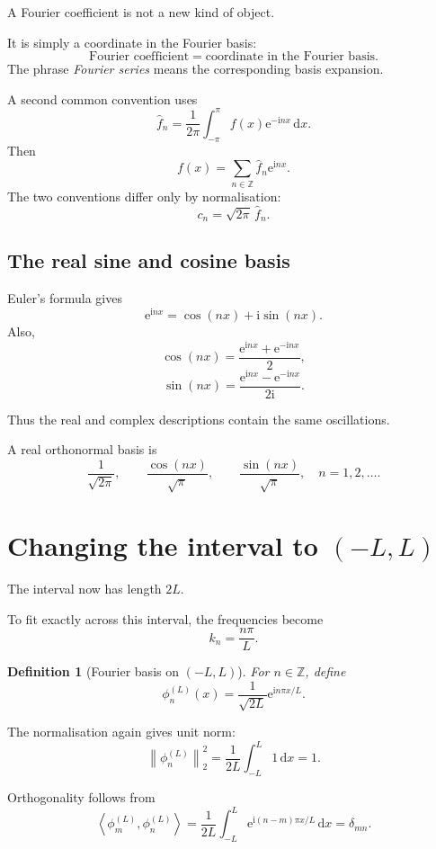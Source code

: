 \documentclass[11pt,a5paper,oneside,openany]{scrreprt}
\theoremstyle{notes}
\theoremstyle{definitions}
\newtheorem{definition}[theorem]{Definition}
\newcommand{\Z}{\mathbb{Z}}
\newcommand{\ip}[2]{\left\langle #1,#2\right\rangle}
\newcommand{\norm}[1]{\left\lVert #1\right\rVert}
\newcommand{\dd}{\,\mathrm{d}}
\newcommand{\e}{\mathrm{e}}
\begin{document}
\begin{bridge}
A Fourier coefficient is not a new kind of object.

It is simply a coordinate in the Fourier basis:
\[
 \boxed{\text{Fourier coefficient}
 =\text{coordinate in the Fourier basis}.}
\]
The phrase \emph{Fourier series} means the corresponding basis expansion.
\end{bridge}

A second common convention uses
\[
 \widehat f_n
 =\frac1{2\pi}\int_{-\pi}^{\pi}
 f(x)\e^{-\mathrm i nx}\dd x.
\]
Then
\[
 f(x)=\sum_{n\in\Z}\widehat f_n\e^{\mathrm i nx}.
\]
The two conventions differ only by normalisation:
\[
 c_n=\sqrt{2\pi}\,\widehat f_n.
\]

\subsection*{The real sine and cosine basis}

Euler's formula gives
\[
 \e^{\mathrm i nx}=\cos(nx)+\mathrm i\sin(nx).
\]
Also,
\[
 \cos(nx)
 =\frac{\e^{\mathrm i nx}+\e^{-\mathrm i nx}}2,
\]
\[
 \sin(nx)
 =\frac{\e^{\mathrm i nx}-\e^{-\mathrm i nx}}
 {2\mathrm i}.
\]

Thus the real and complex descriptions contain the same oscillations.

A real orthonormal basis is
\[
 \boxed{
 \frac1{\sqrt{2\pi}},
 \qquad
 \frac{\cos(nx)}{\sqrt\pi},
 \qquad
 \frac{\sin(nx)}{\sqrt\pi},
 \quad n=1,2,\ldots .}
\]

\section{Changing the interval to $(-L,L)$}

The interval now has length $2L$.

To fit exactly across this interval, the frequencies become
\[
 k_n=\frac{n\pi}{L}.
\]

\begin{definition}[Fourier basis on $(-L,L)$]
For $n\in\Z$, define
\[
 \boxed{
 \phi_n^{(L)}(x)
 =\frac1{\sqrt{2L}}
 \e^{\mathrm i n\pi x/L}.}
\]
\end{definition}

The normalisation again gives unit norm:
\[
 \norm{\phi_n^{(L)}}_2^2
 =\frac1{2L}\int_{-L}^{L}1\dd x
 =1.
\]

Orthogonality follows from
\[
 \ip{\phi_m^{(L)}}{\phi_n^{(L)}}
 =\frac1{2L}\int_{-L}^{L}
 \e^{\mathrm i(n-m)\pi x/L}\dd x
 =\delta_{mn}.
\]
\end{document}

